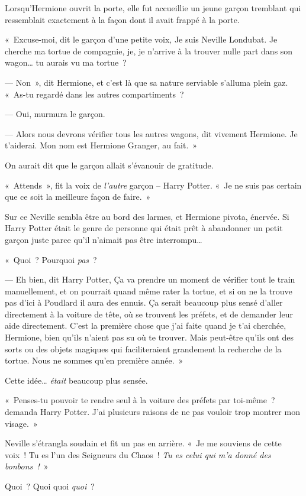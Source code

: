 Lorsqu'Hermione ouvrit la porte, elle fut accueillie un jeune garçon tremblant qui ressemblait exactement à la façon dont il avait frappé à la porte.

«~Excuse-moi, dit le garçon d'une petite voix, Je suis Neville Londubat. Je cherche ma tortue de compagnie, je, je n'arrive à la trouver nulle part dans son wagon… tu aurais vu ma tortue~?

--- Non~», dit Hermione, et c'est là que sa nature serviable s'alluma plein gaz. «~As-tu regardé dans les autres compartiments~?

--- Oui, murmura le garçon.

--- Alors nous devrons vérifier tous les autres wagons, dit vivement Hermione. Je t'aiderai. Mon nom est Hermione Granger, au fait.~»

On aurait dit que le garçon allait s'évanouir de gratitude.

«~Attends~», fit la voix de \emph{l'autre} garçon -- Harry Potter. «~Je ne suis pas certain que ce soit la meilleure façon de faire.~»

Sur ce Neville sembla être au bord des larmes, et Hermione pivota, énervée. Si Harry Potter était le genre de personne qui était prêt à abandonner un petit garçon juste parce qu'il n'aimait pas être interrompu…

«~Quoi~? Pourquoi \emph{pas}~?

--- Eh bien, dit Harry Potter, Ça va prendre un moment de vérifier tout le train manuellement, et on pourrait quand même rater la tortue, et si on ne la trouve pas d'ici à Poudlard il aura des ennuis. Ça serait beaucoup plus sensé d'aller directement à la voiture de tête, où se trouvent les préfets, et de demander leur aide directement. C'est la première chose que j'ai faite quand je t'ai cherchée, Hermione, bien qu'ils n'aient pas su où te trouver. Mais peut-être qu'ils ont des sorts ou des objets magiques qui faciliteraient grandement la recherche de la tortue. Nous ne sommes qu'en première année.~»

Cette idée… \emph{était} beaucoup plus sensée.

«~Penses-tu pouvoir te rendre seul à la voiture des préfets par toi-même~? demanda Harry Potter. J'ai plusieurs raisons de ne pas vouloir trop montrer mon visage.~»

Neville s'étrangla soudain et fit un pas en arrière. «~Je me souviens de cette voix~! Tu es l'un des Seigneurs du Chaos~! \emph{Tu es celui qui m'a donné des bonbons~!}~»

Quoi~? Quoi quoi \emph{quoi}~?

